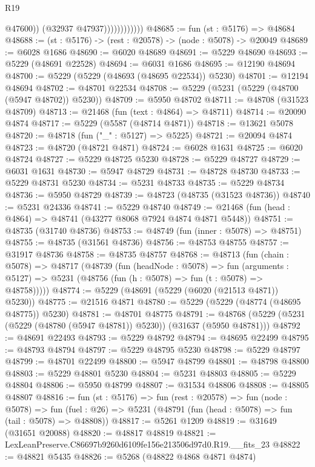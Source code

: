 \begin{lexlean}{R19}
\begin{coremodule}
                              @47600))
                          (@32937 @47937))))))))))))
@48685 := fun (st : @5176) => @48684
@48688 := (st : @5176) -> (rest : @20578) -> (node : @5078) -> @20049
@48689 := @6028 @1686
@48690 := @6020 @48689
@48691 := @5229 @48690
@48693 := @5229 (@48691 @22528)
@48694 := @6031 @1686
@48695 := @12190 @48694
@48700 := @5229 (@5229 (@48693 (@48695 @22534)) @5230)
@48701 := @12194 @48694
@48702 := @48701 @22534
@48708 := @5229 (@5231 (@5229 (@48700 (@5947 @48702)) @5230))
@48709 := @5950 @48702
@48711 := @48708 (@31523 @48709)
@48713 := @21468 (fun (text : @4864) => @48711)
@48714 := @20090 @4874
@48717 := @5229 (@5587 (@48714 @4871))
@48718 := @13621 @5078
@48720 := @48718 (fun ("_" : @5127) => @5225)
@48721 := @20094 @4874
@48723 := @48720 (@48721 @4871)
@48724 := @6028 @1631
@48725 := @6020 @48724
@48727 := @5229 @48725 @5230
@48728 := @5229 @48727
@48729 := @6031 @1631
@48730 := @5947 @48729
@48731 := @48728 @48730
@48733 := @5229 @48731 @5230
@48734 := @5231 @48733
@48735 := @5229 @48734
@48736 := @5950 @48729
@48739 := @48723 (@48735 (@31523 @48736))
@48740 := @5231 @24336
@48741 := @5229 @48740
@48749 := @21468 (fun (head : @4864) => @48741 (@43277 @8068 @7924 @4874 @4871 @5448))
@48751 := @48735 (@31740 @48736)
@48753 := @48749 (fun (inner : @5078) => @48751)
@48755 := @48735 (@31561 @48736)
@48756 := @48753 @48755
@48757 := @31917 @48736
@48758 := @48735 @48757
@48768 := @48713
    (fun (chain : @5078) =>
    @48717
      (@48739
        (fun (headNode : @5078) =>
        fun (arguments : @5127) => @5231 (@48756 (fun (h : @5078) => fun (t : @5078) => @48758)))))
@48774 := @5229 (@48691 (@5229 (@6020 (@21513 @4871)) @5230))
@48775 := @21516 @4871
@48780 := @5229 (@5229 (@48774 (@48695 @48775)) @5230)
@48781 := @48701 @48775
@48791 := @48768 (@5229 (@5231 (@5229 (@48780 (@5947 @48781)) @5230)) (@31637 (@5950 @48781)))
@48792 := @48691 @22493
@48793 := @5229 @48792
@48794 := @48695 @22499
@48795 := @48793 @48794
@48797 := @5229 @48795 @5230
@48798 := @5229 @48797
@48799 := @48701 @22499
@48800 := @5947 @48799
@48801 := @48798 @48800
@48803 := @5229 @48801 @5230
@48804 := @5231 @48803
@48805 := @5229 @48804
@48806 := @5950 @48799
@48807 := @31534 @48806
@48808 := @48805 @48807
@48816 := fun (st : @5176) =>
  fun (rest : @20578) =>
  fun (node : @5078) =>
  fun (fuel : @26) => @5231 (@48791 (fun (head : @5078) => fun (tail : @5078) => @48808))
@48817 := @5261 @1209
@48819 := @31649 (@31651 @20088)
@48820 := @48817 @48819
@48821 := LexLeanPreserve.C86697b9260d6109fe156e213506d97d0.R19.__fits_23
@48822 := @48821 @5435
@48826 := @5268 (@48822 @4868 @4871 @4874)

\end{coremodule}
\end{lexlean}
